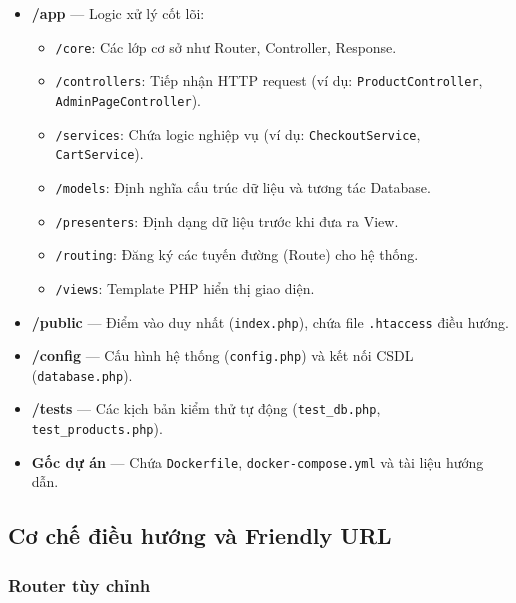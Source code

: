 \documentclass[11pt, a4paper]{article}
\begin{document}
\begin{itemize}[leftmargin=*]
    \item \textbf{/app} --- Logic xử lý cốt lõi:
    \begin{itemize}
        \item \texttt{/core}: Các lớp cơ sở như Router, Controller, Response.
        \item \texttt{/controllers}: Tiếp nhận HTTP request (ví dụ: \texttt{ProductController}, \texttt{AdminPageController}).
        \item \texttt{/services}: Chứa logic nghiệp vụ (ví dụ: \texttt{CheckoutService}, \texttt{CartService}).
        \item \texttt{/models}: Định nghĩa cấu trúc dữ liệu và tương tác Database.
        \item \texttt{/presenters}: Định dạng dữ liệu trước khi đưa ra View.
        \item \texttt{/routing}: Đăng ký các tuyến đường (Route) cho hệ thống.
        \item \texttt{/views}: Template PHP hiển thị giao diện.
    \end{itemize}
    \item \textbf{/public} --- Điểm vào duy nhất (\texttt{index.php}), chứa file \texttt{.htaccess} điều hướng.
    \item \textbf{/config} --- Cấu hình hệ thống (\texttt{config.php}) và kết nối CSDL (\texttt{database.php}).
    \item \textbf{/tests} --- Các kịch bản kiểm thử tự động (\texttt{test\_db.php}, \texttt{test\_products.php}).
    \item \textbf{Gốc dự án} --- Chứa \texttt{Dockerfile}, \texttt{docker-compose.yml} và tài liệu hướng dẫn.
\end{itemize}

\subsection{Cơ chế điều hướng và Friendly URL}

\subsubsection{Router tùy chỉnh}
\end{document}
